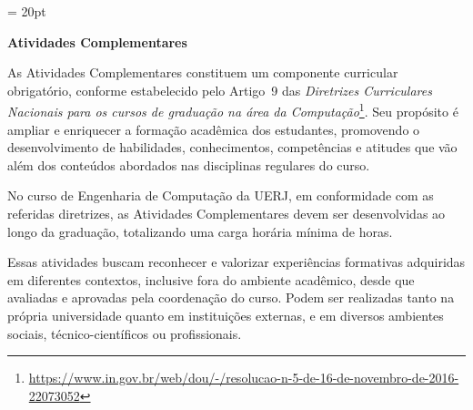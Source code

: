\documentclass[oneside,envcountsame,envcountchap,openany]{svmono}
\begin{document}
\thispagestyle{firstpage} %
\headsep = 20pt
\setlength{\tabcolsep}{5pt} %
\vspace*{2.0cm}

\pagestyle{plain} %

\begin{center}
  \textbf{\LARGE Atividades Complementares}
\end{center}
\vspace*{0.5cm}

As Atividades Complementares constituem um componente curricular obrigatório, conforme estabelecido pelo Artigo~9\textordmasculine{} das \textit{Diretrizes Curriculares Nacionais para os cursos de graduação na área da Computação}\footnote{\url{https://www.in.gov.br/web/dou/-/resolucao-n-5-de-16-de-novembro-de-2016-22073052}}. Seu propósito é ampliar e enriquecer a formação acadêmica dos estudantes, promovendo o desenvolvimento de habilidades, conhecimentos, competências e atitudes que vão além dos conteúdos abordados nas disciplinas regulares do curso.

No curso de Engenharia de Computação da UERJ, em conformidade com as referidas diretrizes, as Atividades Complementares devem ser desenvolvidas ao longo da graduação, totalizando uma carga horária mínima de \hACC horas.

Essas atividades buscam reconhecer e valorizar experiências formativas adquiridas em diferentes contextos, inclusive fora do ambiente acadêmico, desde que avaliadas e aprovadas pela coordenação do curso. Podem ser realizadas tanto na própria universidade quanto em instituições externas, e em diversos ambientes sociais, técnico-científicos ou profissionais.
\end{document}
